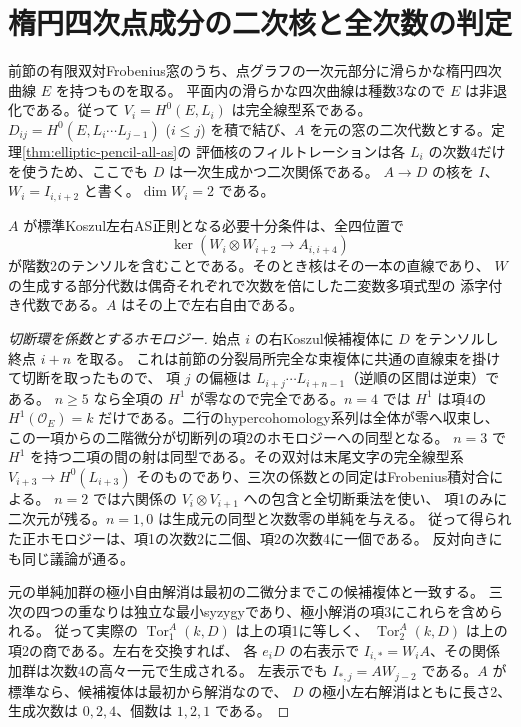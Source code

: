 \section{楕円四次点成分の二次核と全次数の判定}
\label{sec:elliptic-point-quartic}
前節の有限双対Frobenius窓のうち、点グラフの一次元部分に滑らかな楕円四次曲線 $E$ を持つものを取る。
平面内の滑らかな四次曲線は種数3なので $E$ は非退化である。従って
$V_i=H^0(E,L_i)$ は完全線型系である。$D_{ij}=H^0(E,L_i\cdots L_{j-1})$ ($i\le j$)
を積で結び、$A$ を元の窓の二次代数とする。定理\ref{thm:elliptic-pencil-all-as}の
評価核のフィルトレーションは各 $L_i$ の次数4だけを使うため、ここでも $D$ は一次生成かつ二次関係である。
$A\to D$ の核を $I$、$W_i=I_{i,i+2}$ と書く。$\dim W_i=2$ である。

\begin{theorem}\label{thm:elliptic-quartic-as-test}
$A$ が標準Koszul左右AS正則となる必要十分条件は、全四位置で
\[
 \ker(W_i\otimes W_{i+2}\longrightarrow A_{i,i+4})
\]
が階数2のテンソルを含むことである。そのとき核はその一本の直線であり、
$W$ の生成する部分代数は偶奇それぞれで次数を倍にした二変数多項式型の
添字付き代数である。$A$ はその上で左右自由である。
\end{theorem}
\begin{proof}[切断環を係数とするホモロジー]
始点 $i$ の右Koszul候補複体に $D$ をテンソルし終点 $i+n$ を取る。
これは前節の分裂局所完全な束複体に共通の直線束を掛けて切断を取ったもので、
項 $j$ の偏極は $L_{i+j}\cdots L_{i+n-1}$（逆順の区間は逆束）である。
$n\ge5$ なら全項の $H^1$ が零なので完全である。$n=4$ では $H^1$ は項4の
$H^1(\mathcal O_E)=k$ だけである。二行のhypercohomology系列は全体が零へ収束し、
この一項からの二階微分が切断列の項2のホモロジーへの同型となる。
$n=3$ で $H^1$ を持つ二項の間の射は同型である。その双対は末尾文字の完全線型系
$V_{i+3}\to H^0(L_{i+3})$ そのものであり、三次の係数との同定はFrobenius積対合による。
$n=2$ では六関係の $V_i\otimes V_{i+1}$ への包含と全切断乗法を使い、
項1のみに二次元が残る。$n=1,0$ は生成元の同型と次数零の単純を与える。
従って得られた正ホモロジーは、項1の次数2に二個、項2の次数4に一個である。
反対向きにも同じ議論が通る。

元の単純加群の極小自由解消は最初の二微分までこの候補複体と一致する。
三次の四つの重なりは独立な最小syzygyであり、極小解消の項3にこれらを含められる。
従って実際の $\operatorname{Tor}_1^A(k,D)$ は上の項1に等しく、
$\operatorname{Tor}_2^A(k,D)$ は上の項2の商である。左右を交換すれば、
各 $e_iD$ の右表示で $I_{i,*}=W_i A$、その関係加群は次数4の高々一元で生成される。
左表示でも $I_{*,j}=A W_{j-2}$ である。$A$ が標準なら、候補複体は最初から解消なので、
$D$ の極小左右解消はともに長さ2、生成次数は $0,2,4$、個数は $1,2,1$ である。
\end{proof}

